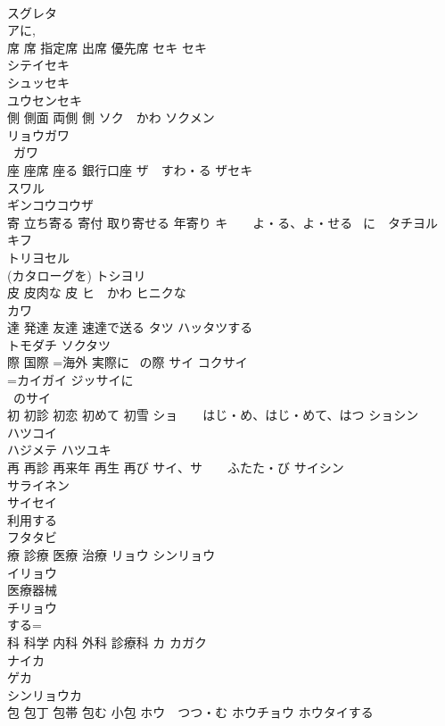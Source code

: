\documentclass[8pt]{extreport}
\begin{document}
\begin{CJK}{UTF8}{min}
\\	スグレタ 
\\	アに, 
\\	席 席 指定席 出席 優先席	セキ セキ　
\\	シテイセキ　
\\	シュッセキ　
\\	ユウセンセキ　
\\	側 側面 両側 側	ソク　かわ ソクメン 
\\	リョウガワ 
\\	~ガワ 
\\	座 座席 座る 銀行口座	ザ　すわ・る ザセキ 
\\	スワル 
\\	ギンコウコウザ 
\\	寄 立ち寄る 寄付 取り寄せる 年寄り	キ　　よ・る、よ・せる ~に　タチヨル 
\\	キフ 
\\	トリヨセル 
\\	(カタローグを) トシヨリ
\\	皮 皮肉な 皮	ヒ　かわ ヒニクな　
\\	カワ 
\\	達 発達 友達 速達で送る	タツ ハッタツする 
\\	トモダチ ソクタツ 
\\	際 国際 =海外 実際に ~の際	サイ コクサイ 
\\	=カイガイ ジッサイに 
\\	~のサイ 
\\	初 初診 初恋 初めて 初雪	ショ　　はじ・め、はじ・めて、はつ ショシン 
\\	ハツコイ 
\\	ハジメテ ハツユキ 
\\	再 再診 再来年 再生 再び	サイ、サ　　ふたた・び サイシン 
\\	サライネン 
\\	サイセイ 
\\	利用する 
\\	フタタビ 
\\	療 診療 医療 治療	リョウ シンリョウ
\\	イリョウ 
\\	医療器械 
\\	チリョウ 
\\	する=
\\	科 科学 内科 外科 診療科	カ カガク 
\\	ナイカ 
\\	ゲカ 
\\	シンリョウカ 
\\	包 包丁 包帯 包む 小包	ホウ　つつ・む ホウチョウ ホウタイする　

\end{CJK}
\end{document}
